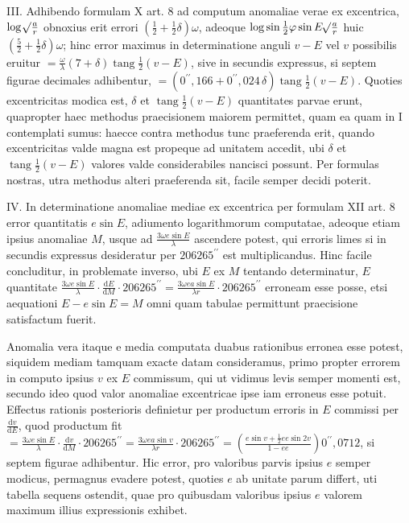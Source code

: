 III. Adhibendo formulam X art. 8 ad computum anomaliae verae ex excentrica, $\log\mathord{{}^{}\!\surd}\frac{a}{r}$ obnoxius erit errori $(\frac{1}{2}+\frac{1}{2}\delta)\omega$, adeoque $\log\sin\frac{1}{2}\varphi\sin E\mathord{{}^{}\!\surd}\frac{a}{r}$ huic $(\frac{5}{2}+\frac{1}{2}\delta)\omega$; hinc error maximus in determinatione anguli $v-E$ vel $v$ possibilis eruitur $=\frac{\omega}{\lambda}(7+\delta)\operatorname{tang}\frac{1}{2}(v-E)$, sive in secundis expressus, si septem figurae decimales adhibentur, $=(0^{\prime\prime}{,}166+0^{\prime\prime}{,}024\,\delta)\operatorname{tang}\frac{1}{2}(v-E)$. Quoties excentricitas modica est, $\delta$ et $\operatorname{tang}\frac{1}{2}(v-E)$ quantitates parvae erunt, quapropter haec methodus praecisionem maiorem permittet, quam ea quam in I contemplati sumus: haecce contra methodus tunc praeferenda erit, quando excentricitas valde magna est propeque ad unitatem accedit, ubi $\delta$ et $\operatorname{tang}\frac{1}{2}(v-E)$ valores valde considerabiles nancisci possunt. Per formulas nostras, utra methodus alteri praeferenda sit, facile semper decidi poterit.

IV. In determinatione anomaliae mediae ex excentrica per formulam XII art. 8 error quantitatis $e\sin E$, adiumento logarithmorum computatae, adeoque etiam ipsius anomaliae $M$, usque ad $\frac{3\omega e\sin E}{\lambda}$ ascendere potest, qui erroris limes
si in secundis expressus desideratur per $206265^{\prime\prime}$ est multiplicandus. Hinc facile concluditur, in problemate inverso, ubi $E$ ex $M$ tentando determinatur, $E$ quantitate $\frac{3\omega e\sin E}{\lambda}\cdot\frac{\mathrm{d}E}{\mathrm{d}M}\cdot206265^{\prime\prime}=\frac{3\omega ea\sin E}{\lambda r}\cdot206265^{\prime\prime}$ erroneam esse posse, etsi aequationi $E-e\sin E=M$ omni quam tabulae permittunt praecisione satisfactum fuerit.

Anomalia vera itaque e media computata duabus rationibus erronea esse potest, siquidem mediam tamquam exacte datam consideramus, primo propter errorem in computo ipsius $v$ ex $E$ commissum, qui ut vidimus levis semper momenti est, secundo ideo quod valor anomaliae excentricae ipse iam erroneus esse potuit. Effectus rationis posterioris definietur per productum erroris in $E$ commissi per $\frac{\mathrm{d}v}{\mathrm{d}E}$, quod productum fit $=\frac{3\omega e\sin E}{\lambda}\cdot\frac{\mathrm{d}v}{\mathrm{d}M}\cdot206265^{\prime\prime}=\frac{3\omega ea\sin v}{\lambda r}\cdot206265^{\prime\prime}=\left(\frac{e\sin v+\frac{1}{2}ee\sin 2v}{1-ee}\right)0^{\prime\prime}{,}0712$, si septem figurae adhibentur. Hic error, pro valoribus parvis ipsius $e$ semper modicus, permagnus evadere potest, quoties $e$ ab unitate parum differt, uti tabella sequens ostendit, quae pro quibusdam valoribus ipsius $e$ valorem maximum illius expressionis exhibet.

